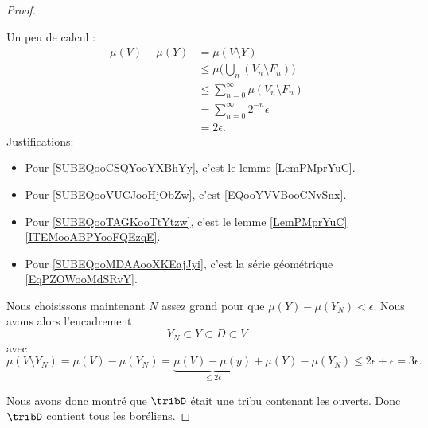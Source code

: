 \begin{proof}
\begin{subproof}
\begin{subproof}
                    Un peu de calcul :
                    \begin{subequations}
                        \begin{align}
                            \mu(V)-\mu(Y)&= \mu(V\setminus Y)   \label{SUBEQooCSQYooYXBhYy}\\
                            &\leq\mu\big( \bigcup_n(V_n\setminus F_n) \big)     \label{SUBEQooVUCJooHjObZw}\\
                            &\leq \sum_{n=0}^{\infty}\mu(V_n\setminus F_n)      \label{SUBEQooTAGKooTtYtzw}\\
                            &=\sum_{n=0}^{\infty}2^{-n}\epsilon\\
                            &=2\epsilon.        \label{SUBEQooMDAAooXKEajJyi}
                        \end{align}
                    \end{subequations}
                    Justifications:
                    \begin{itemize}
                        \item Pour \eqref{SUBEQooCSQYooYXBhYy}, c'est le lemme \ref{LemPMprYuC}.
                        \item Pour \eqref{SUBEQooVUCJooHjObZw}, c'est \eqref{EQooYVVBooCNvSnx}.
                        \item Pour \eqref{SUBEQooTAGKooTtYtzw}, c'est le lemme \ref{LemPMprYuC}\ref{ITEMooABPYooFQEzqE}.
                        \item Pour \eqref{SUBEQooMDAAooXKEajJyi}, c'est la série géométrique \eqref{EqPZOWooMdSRvY}.
                    \end{itemize}
                    
                    Nous choisissons maintenant \( N\) assez grand pour que \( \mu(Y)-\mu(Y_N)<\epsilon\). Nous avons alors l'encadrement
                    \begin{equation}
                        Y_N\subset Y\subset D\subset V
                    \end{equation}
                    avec 
                    \begin{equation}
                        \mu(V\setminus Y_N)=\mu(V)-\mu(Y_N)=\underbrace{\mu(V)-\mu(y)}_{\leq 2\epsilon}+\mu(Y)-\mu(Y_N)\leq 2\epsilon+\epsilon=3\epsilon.
                    \end{equation}
            \end{subproof}
    \end{subproof}
    Nous avons donc montré que \( \tribD\) était une tribu contenant les ouverts. Donc \( \tribD\) contient tous les boréliens.
\end{proof}

